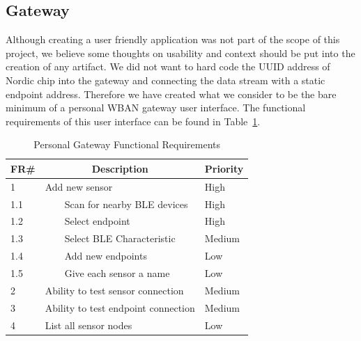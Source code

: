 
\subsection{Gateway} %
\label{sub:gateway}


Although creating a user friendly application was not part of the scope of this project, we believe some thoughts on usability and context should be put into the creation of any artifact. We did not want to hard code the UUID address of Nordic chip into the gateway and connecting the data stream with a static endpoint address. Therefore we have created what we consider to be the bare minimum of a personal WBAN gateway user interface. The functional requirements of this user interface can be found in Table~\ref{tab:gatewayRequirements}.

\begin{table}[]
\centering
\caption{Personal Gateway Functional Requirements}
\label{tab:gatewayRequirements}
\begin{tabular}{|l|l|l|}
\hline
\textbf{FR\#} & \multicolumn{1}{c|}{\textbf{Description}} & \multicolumn{1}{c|}{\textbf{Priority}} \\ \hline
1             & Add new sensor                            & High                                   \\ \hline
1.1           & \ \ \ \ Scan for nearby BLE devices               & High                                   \\ \hline
1.2           & \ \ \ \ Select endpoint                           & High                                   \\ \hline
1.3           & \ \ \ \ Select BLE Characteristic                 & Medium                                 \\ \hline
1.4           & \ \ \ \ Add new endpoints                         & Low                                 \\ \hline
1.5           & \ \ \ \ Give each sensor a name                   & Low                                    \\ \hline
2             & Ability to test sensor connection         & Medium                                 \\ \hline
3             & Ability  to test endpoint connection      & Medium                                 \\ \hline
4             & List all sensor nodes                     & Low                                    \\ \hline
\end{tabular}
\end{table}

